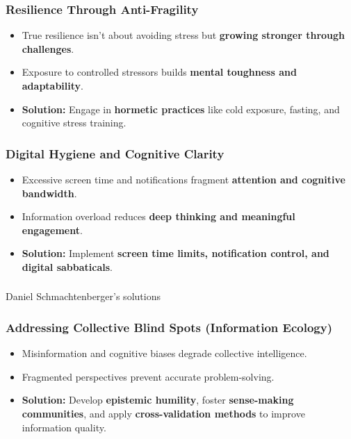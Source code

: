 \begin{frame}[fragile]\frametitle{Resilience Through Anti-Fragility}
	\begin{itemize}
	\item True resilience isn’t about avoiding stress but \textbf{growing stronger through challenges}.
	\item Exposure to controlled stressors builds \textbf{mental toughness and adaptability}.
	\item \textbf{Solution:} Engage in \textbf{hormetic practices} like cold exposure, fasting, and cognitive stress training.
	\end{itemize}
\end{frame}

\begin{frame}[fragile]\frametitle{Digital Hygiene and Cognitive Clarity}
	\begin{itemize}
	\item Excessive screen time and notifications fragment \textbf{attention and cognitive bandwidth}.
	\item Information overload reduces \textbf{deep thinking and meaningful engagement}.
	\item \textbf{Solution:} Implement \textbf{screen time limits, notification control, and digital sabbaticals}.
	\end{itemize}
\end{frame}

\begin{frame}[fragile]\frametitle{}
\begin{center}
{\Large Daniel Schmachtenberger's solutions}

\end{center}
\end{frame}

\begin{frame}[fragile]\frametitle{Addressing Collective Blind Spots (Information Ecology)}
	\begin{itemize}
	\item Misinformation and cognitive biases degrade collective intelligence.
	\item Fragmented perspectives prevent accurate problem-solving.
	\item \textbf{Solution:} Develop \textbf{epistemic humility}, foster \textbf{sense-making communities}, and apply \textbf{cross-validation methods} to improve information quality.
	\end{itemize}
\end{frame}

